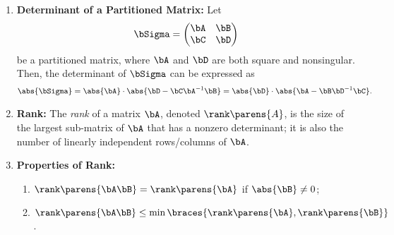 \documentclass[12pt]{article}
\begin{document}
\begin{enumerate}[label=\textbf{\arabic*.}]
	\item \textbf{Determinant of a Partitioned Matrix:} Let
	\begin{align*}
		\bSigma = \begin{pmatrix}
			\bA & \bB \\ \bC & \bD
		\end{pmatrix}
	\end{align*}
	be a partitioned matrix, where $\bA$ and $\bD$ are both square and nonsingular. Then, the determinant of $\bSigma$ can be expressed as 
	\begin{align*}
		\abs{\bSigma} = \abs{\bA} \cdot \abs{\bD - \bC \bA^{-1} \bB} = \abs{\bD} \cdot \abs{\bA - \bB \bD^{-1} \bC}. 
	\end{align*}
	
	\item \textbf{Rank:} The \textit{rank} of a matrix $\bA$, denoted $\rank \parens{A}$, is the size of the largest sub-matrix of $\bA$ that has a nonzero determinant; it is also the number of linearly independent rows/columns of $\bA$. 

	\item \textbf{Properties of Rank:} 
	\begin{enumerate}
		\item $\rank \parens{\bA\bB} = \rank \parens{\bA}$ if $\abs{\bB} \ne 0$; 
		\item $\rank \parens{\bA\bB} \le \min \braces{\rank \parens{\bA}, \rank \parens{\bB}}$. 
	\end{enumerate}
	

\end{enumerate}
\end{document}

